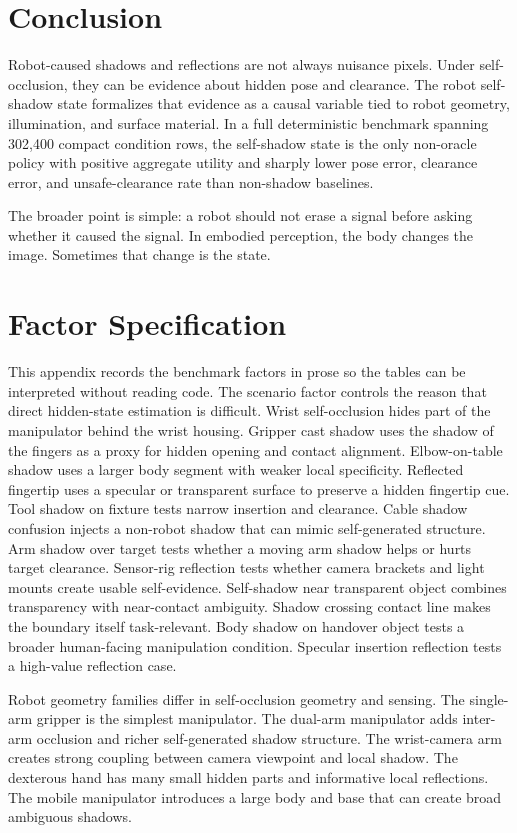 \documentclass{article}
\begin{document}
\section{Conclusion}

Robot-caused shadows and reflections are not always nuisance pixels. Under self-occlusion, they can be evidence about hidden pose and clearance. The robot self-shadow state formalizes that evidence as a causal variable tied to robot geometry, illumination, and surface material. In a full deterministic benchmark spanning 302,400 compact condition rows, the self-shadow state is the only non-oracle policy with positive aggregate utility and sharply lower pose error, clearance error, and unsafe-clearance rate than non-shadow baselines.

The broader point is simple: a robot should not erase a signal before asking whether it caused the signal. In embodied perception, the body changes the image. Sometimes that change is the state.

\clearpage
\appendix

\section{Factor Specification}

This appendix records the benchmark factors in prose so the tables can be interpreted without reading code. The scenario factor controls the reason that direct hidden-state estimation is difficult. Wrist self-occlusion hides part of the manipulator behind the wrist housing. Gripper cast shadow uses the shadow of the fingers as a proxy for hidden opening and contact alignment. Elbow-on-table shadow uses a larger body segment with weaker local specificity. Reflected fingertip uses a specular or transparent surface to preserve a hidden fingertip cue. Tool shadow on fixture tests narrow insertion and clearance. Cable shadow confusion injects a non-robot shadow that can mimic self-generated structure. Arm shadow over target tests whether a moving arm shadow helps or hurts target clearance. Sensor-rig reflection tests whether camera brackets and light mounts create usable self-evidence. Self-shadow near transparent object combines transparency with near-contact ambiguity. Shadow crossing contact line makes the boundary itself task-relevant. Body shadow on handover object tests a broader human-facing manipulation condition. Specular insertion reflection tests a high-value reflection case.

Robot geometry families differ in self-occlusion geometry and sensing. The single-arm gripper is the simplest manipulator. The dual-arm manipulator adds inter-arm occlusion and richer self-generated shadow structure. The wrist-camera arm creates strong coupling between camera viewpoint and local shadow. The dexterous hand has many small hidden parts and informative local reflections. The mobile manipulator introduces a large body and base that can create broad ambiguous shadows.
\end{document}
